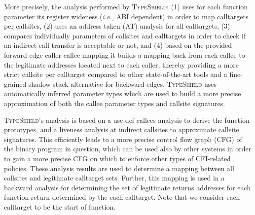 More precisely, the analysis performed by \textsc{TypeShield}:
(1) uses for each function parameter its register wideness (\textit{i.e.,} ABI dependent) in order to map calltargets per callsites,  
(2) uses an address taken (AT) analysis for all calltargets, 
(3) compares individually parameters of callsites and calltargets in order to check if an indirect call transfer is acceptable or not, and
(4) based on the provided forward-edge caller-callee mapping it builds a mapping back from each callee to the legitimate addresses located next to each caller,
thereby providing a more strict callsite per calltarget compared to other state-of-the-art tools and a fine-grained shadow stack alternative for backward edges.
\textsc{TypeShield} uses automatically inferred parameter types which are used to build a more precise approximation of both the callee parameter types and callsite signatures. 

\textsc{TypeShield}'s analysis is based on a use-def callees analysis 
to derive the function prototypes, and a liveness analysis at indirect callsites to approximate callsite signatures. 
This efficiently leads to a more precise control flow graph (CFG) of the binary program in question, 
which can be used also by other systems in order to gain a more precise CFG on which to 
enforce other types of CFI-related policies. These analysis results are used to
determine a mapping between all callsites and legitimate calltarget sets. Further,
this mapping is used in a backward analysis for determining the set of legitimate 
returns addresses for each function return determined by the each calltarget. Note that 
we consider each calltarget to be the start of function.

